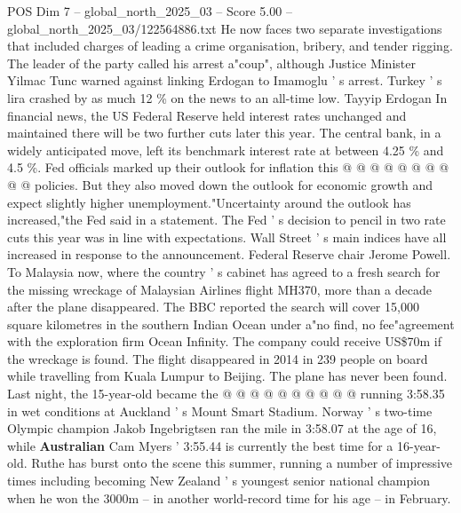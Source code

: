 \begin{textsample}{POS Dim 7 – global\_north\_2025\_03 – Score 5.00 – global\_north\_2025\_03/122564886.txt}
He now faces two separate investigations that included charges of leading a crime organisation, bribery, and tender rigging.
The leader of the party called his arrest a"coup", although Justice Minister Yilmac Tunc warned against linking Erdogan to Imamoglu ' s arrest.
Turkey ' s lira crashed by as much 12 \% on the news to an all-time low.
Tayyip Erdogan In financial news, the US Federal Reserve held interest rates unchanged and maintained there will be two further cuts later this year.
The central bank, in a widely anticipated move, left its benchmark interest rate at between 4.25 \% and 4.5 \%.
Fed officials marked up their outlook for inflation this @ @ @ @ @ @ @ @ @ @ policies.
But they also moved down the outlook for economic growth and expect slightly higher unemployment."Uncertainty around the outlook has increased,"the Fed said in a statement.
The Fed ' s decision to pencil in two rate cuts this year was in line with expectations.
Wall Street ' s main indices have all increased in response to the announcement.
Federal Reserve chair Jerome Powell.
To Malaysia now, where the country ' s cabinet has agreed to a fresh search for the missing wreckage of Malaysian Airlines flight MH370, more than a decade after the plane disappeared.
The BBC reported the search will cover 15,000 square kilometres in the southern Indian Ocean under a"no find, no fee"agreement with the exploration firm Ocean Infinity.
The company could receive US\$70m if the wreckage is found.
The flight disappeared in 2014 in 239 people on board while travelling from Kuala Lumpur to Beijing.
The plane has never been found.
Last night, the 15-year-old became the @ @ @ @ @ @ @ @ @ @ running 3:58.35 in wet conditions at Auckland ' s Mount Smart Stadium.
Norway ' s two-time Olympic champion Jakob Ingebrigtsen ran the mile in 3:58.07 at the age of 16, while \textbf{Australian} Cam Myers ' 3:55.44 is currently the best time for a 16-year-old.
Ruthe has burst onto the scene this summer, running a number of impressive times including becoming New Zealand ' s youngest senior national champion when he won the 3000m -- in another world-record time for his age -- in February.

\end{textsample}
